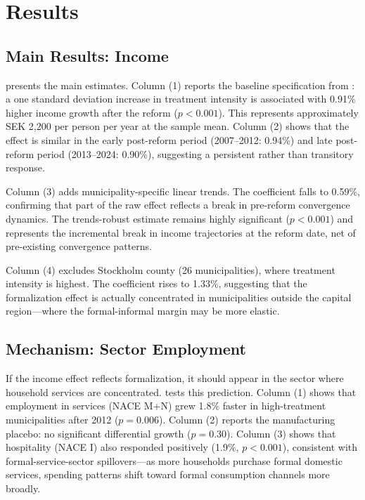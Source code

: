 \documentclass[12pt]{article}
\begin{document}
\section{Results}

\subsection{Main Results: Income}

 presents the main estimates. Column (1) reports the baseline specification from : a one standard deviation increase in treatment intensity is associated with 0.91\% higher income growth after the reform ($p < 0.001$). This represents approximately SEK 2,200 per person per year at the sample mean. Column (2) shows that the effect is similar in the early post-reform period (2007--2012: 0.94\%) and late post-reform period (2013--2024: 0.90\%), suggesting a persistent rather than transitory response.

Column (3) adds municipality-specific linear trends. The coefficient falls to 0.59\%, confirming that part of the raw effect reflects a break in pre-reform convergence dynamics. The trends-robust estimate remains highly significant ($p < 0.001$) and represents the incremental break in income trajectories at the reform date, net of pre-existing convergence patterns.

Column (4) excludes Stockholm county (26 municipalities), where treatment intensity is highest. The coefficient rises to 1.33\%, suggesting that the formalization effect is actually concentrated in municipalities outside the capital region---where the formal-informal margin may be more elastic.



\subsection{Mechanism: Sector Employment}

If the income effect reflects formalization, it should appear in the sector where household services are concentrated.  tests this prediction. Column (1) shows that employment in services (NACE M+N) grew 1.8\% faster in high-treatment municipalities after 2012 ($p = 0.006$). Column (2) reports the manufacturing placebo: no significant differential growth ($p = 0.30$). Column (3) shows that hospitality (NACE I) also responded positively (1.9\%, $p < 0.001$), consistent with formal-service-sector spillovers---as more households purchase formal domestic services, spending patterns shift toward formal consumption channels more broadly.
\end{document}
